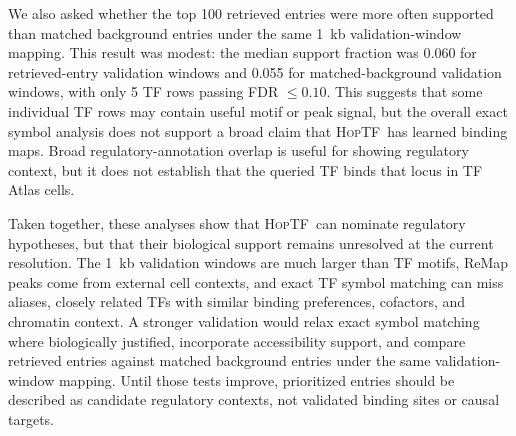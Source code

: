 \documentclass[11pt]{article}
\newcommand{\hoptf}{\textsc{HopTF}}
\begin{document}
We also asked whether the top 100 retrieved entries were more often supported than matched background entries under the same 1~kb validation-window mapping. This result was modest: the median support fraction was 0.060 for retrieved-entry validation windows and 0.055 for matched-background validation windows, with only 5 TF rows passing FDR \(\leq 0.10\). This suggests that some individual TF rows may contain useful motif or peak signal, but the overall exact symbol analysis does not support a broad claim that \hoptf\ has learned binding maps. Broad regulatory-annotation overlap is useful for showing regulatory context, but it does not establish that the queried TF binds that locus in TF Atlas cells.

Taken together, these analyses show that \hoptf\ can nominate regulatory hypotheses, but that their biological support remains unresolved at the current resolution. The 1~kb validation windows are much larger than TF motifs, ReMap peaks come from external cell contexts, and exact TF symbol matching can miss aliases, closely related TFs with similar binding preferences, cofactors, and chromatin context. A stronger validation would relax exact symbol matching where biologically justified, incorporate accessibility support, and compare retrieved entries against matched background entries under the same validation-window mapping. Until those tests improve, prioritized entries should be described as candidate regulatory contexts, not validated binding sites or causal targets.

\begin{table}[H]
\centering
\caption{Motif and ReMap recall remains limited under exact TF symbol matching; stronger validation with accessibility support and matched background windows remains pending.}
\label{tab:motif_results}
\end{table}
\end{document}
